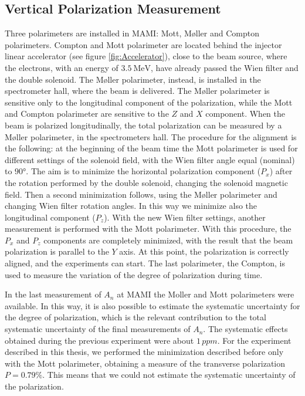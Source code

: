 \subsection{Vertical Polarization Measurement}
Three polarimeters are installed in MAMI: Mott, M\o ller and Compton polarimeters. Compton and Mott polarimeter are located behind the injector linear accelerator (see figure \ref{fig:Accelerator}), close to the beam source, where the electrons, with an energy of $\SI{3.5}{\mega \electronvolt}$, have already passed the Wien filter and the double solenoid. The M\o ller polarimeter, instead, is installed in the spectrometer hall, where the beam is delivered. The M\o ller polarimeter is sensitive only to the longitudinal component of the polarization, while the Mott and Compton polarimeter are sensitive to the $Z$ and $X$ component. 
When the beam is polarized longitudinally, the total polarization can be measured by a M\o ller polarimeter, in the spectrometers hall. The procedure for the alignment is the following: at the beginning of the beam time the Mott polarimeter is used for different settings of the solenoid field, with the Wien filter angle equal (nominal) to $\ang{90}$. The aim is to minimize the horizontal polarization component ($P_{x}$) after the rotation performed by the double solenoid, changing the solenoid magnetic field. Then a second minimization follows, using the M\o ller polarimeter and changing Wien filter  rotation angles. In this way we minimize also the longitudinal component ($P_{z}$). With the new Wien filter settings, another measurement is performed with the Mott polarimeter. With this procedure, the $P_{x}$ and $P_{z}$ components are completely minimized, with the result that the beam polarization is parallel to the $Y$ axis.
At this point, the polarization is correctly aligned, and the experiments can start. The last polarimeter, the Compton, is used to measure the variation of the degree of polarization during time. 

In the last measurement of $A_{n}$ at MAMI \cite{Esser:2018vdp} the Moller and Mott polarimeters were available. In this way, it is also possible to estimate the systematic uncertainty for the degree of polarization, which is the relevant contribution to the total systematic uncertainty of the final measurements of $A_{n}$. The systematic effects obtained during the previous experiment were about $1 \, ppm$. For the experiment described in this thesis, we performed the minimization described before only with the Mott polarimeter, obtaining a measure of the transverse polarization $P = 0.79\%$. This means that we could not estimate the systematic uncertainty of the polarization.

